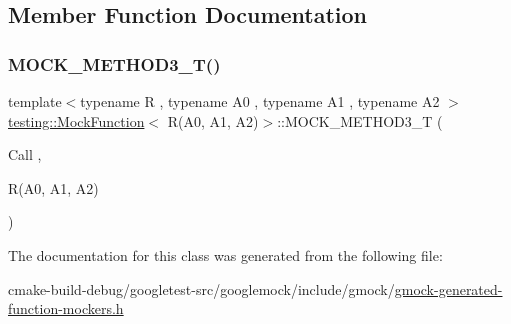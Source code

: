 \subsection{Member Function Documentation}
\mbox{\label{classtesting_1_1MockFunction_3_01R_07A0_00_01A1_00_01A2_08_4_afcc79eab94b7d873f71ccf7b08ce582f}} 
\subsubsection{\texorpdfstring{MOCK\_METHOD3\_T()}{MOCK\_METHOD3\_T()}}
{\footnotesize\ttfamily template$<$typename R , typename A0 , typename A1 , typename A2 $>$ \\
\mbox{\hyperlink{classtesting_1_1MockFunction}{testing\+::\+Mock\+Function}}$<$ R(A0, A1, A2)$>$\+::M\+O\+C\+K\+\_\+\+M\+E\+T\+H\+O\+D3\+\_\+T (\begin{DoxyParamCaption}\item[{Call}]{,  }\item[{R(A0, A1, A2)}]{ }\end{DoxyParamCaption})}



The documentation for this class was generated from the following file\+:\begin{DoxyCompactItemize}
\item 
cmake-\/build-\/debug/googletest-\/src/googlemock/include/gmock/\mbox{\hyperlink{gmock-generated-function-mockers_8h}{gmock-\/generated-\/function-\/mockers.\+h}}\end{DoxyCompactItemize}
